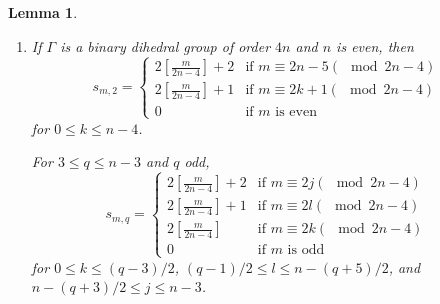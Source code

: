 \documentclass{amsart}[12pt]
\newtheorem{lemma}[theorem]{Lemma}
\theoremstyle{definition}
\theoremstyle{remark}
\numberwithin{equation}{section}
\begin{document}
\begin{lemma}
\begin{enumerate}
\[
s_{m, 0} = 
\begin{cases} 
 [\frac{m}{n + 1}] + 1 & \textrm{if $m$ is even}\\
 [\frac{m}{n + 1}]  & \textrm{if $m$ is odd}
\end{cases}
\]
For $0 < i \leq n - i$,
\[
s_{m, i} = s_{m, n - i} = 
\begin{cases} 
 [\frac{m}{n + 1}] + 1 &  \textrm{if $m \equiv i, i + 2, \dots, n - i, n - i + 1, \dots, n - 1, n (\mod n + 1)$}  \\
 [\frac{m}{n + 1}]  & \textrm{if $m \equiv 0, 1, \dots, i - 1, i + 1, \dots, n - i - 1(\mod n + 1)$} 
\end{cases}
\]
\item If $\Gamma$ is a binary dihedral group of order $4n$ and $n$ is even, then
\[
s_{m, 2} = 
\begin{cases} 
2 [\frac{m}{2n - 4}] + 2 & \textrm{if $m \equiv 2n - 5 (\mod 2n - 4)$ } \\
2 [\frac{m}{2n - 4}] + 1 & \textrm{if $m \equiv 2k + 1(\mod 2n - 4)$ } \\
0 & \textrm{if $m$ is even}
\end{cases}
\]
for $0 \leq k \leq n - 4$.

For $3 \leq q \leq n - 3$ and $q$ odd,
\[
s_{m, q} = 
\begin{cases} 
2 [\frac{m}{2n - 4}] + 2 & \textrm{if $m \equiv 2j (\mod 2n - 4)$ } \\
2 [\frac{m}{2n - 4}] + 1 & \textrm{if $m \equiv 2l (\mod 2n - 4)$ } \\
2 [\frac{m}{2n - 4}] & \textrm{if $m \equiv 2k (\mod 2n - 4)$ } \\
0 & \textrm{if $m$ is odd}
\end{cases}
\]
for $0 \leq k \leq (q - 3)/2$, $(q - 1)/2 \leq l \leq n - (q + 5)/2$, and $n - (q + 3)/2 \leq j \leq n - 3$.


\end{enumerate}
\end{lemma}
\end{document}
